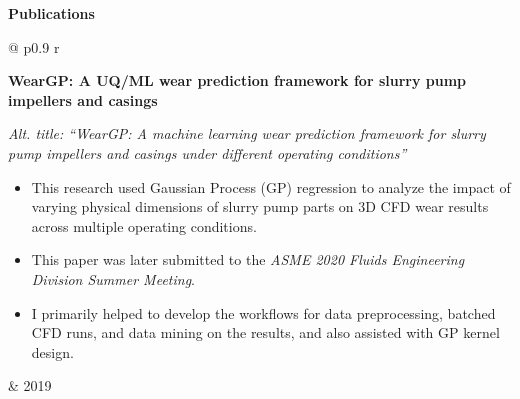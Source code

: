 \documentclass[letterpaper,11pt]{article}
\newcommand{\resheading}[1]{
	{\large \colorbox{sectionheaderbg}{
		\begin{minipage}{\textwidth}{
			\textcolor{sectionheaderfg}{\textbf{#1 \vphantom{p\^{E}}}}
		}
		\end{minipage}
	}}}
\begin{document}
\resheading{Publications}

\vspace{0.1in}

\begin{tabular*}{\textwidth}{@{\extracolsep{\fill}} p{0.9\textwidth} r}
  \begin{minipage}[t]{\linewidth}
    \textbf{WearGP: A UQ/ML wear prediction framework for slurry pump impellers and casings}

	\textit{Alt. title: ``WearGP: A machine learning wear prediction
framework for slurry pump impellers and casings
under different operating conditions''}
    \begin{itemize}[leftmargin=*,noitemsep]
      \item This research used Gaussian Process (GP) regression to analyze the impact of varying
	  physical dimensions of slurry pump parts on 3D CFD wear results across multiple operating conditions.
      \item This paper was later submitted to the \textit{ASME 2020 Fluids Engineering Division Summer Meeting}.
      \item I primarily helped to develop the workflows for data preprocessing, batched CFD runs,
	  and data mining on the results, and also assisted with GP kernel design.
    \end{itemize}
  \end{minipage}
  & \hfill 2019
\end{tabular*}

% 
% 
% 
\end{document}
